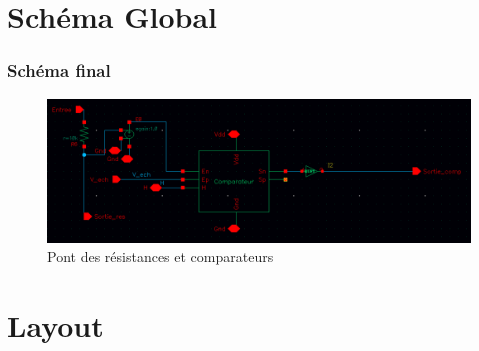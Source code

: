 \documentclass{beamer}
\begin{document}
\section{Sch\'ema Global}

\begin{frame}
\frametitle{Sch\'ema final}

\begin{figure}[!htb]
  \includegraphics[width=\linewidth]{res_comp.png}
  \caption{Pont des r\'esistances et comparateurs}
\end{figure}

\end{frame}


\section{Layout}
\end{document}
